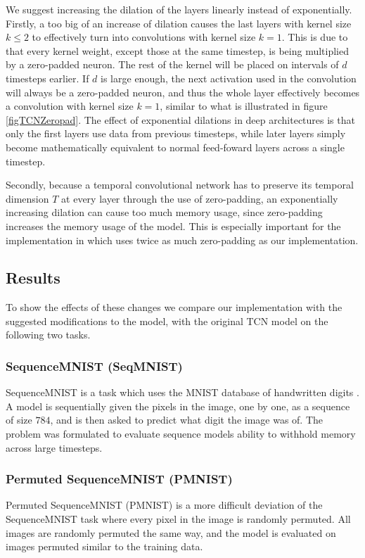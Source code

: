\documentclass[a4paper, twoside]{article}
\begin{document}
We suggest increasing the dilation of the layers linearly instead of exponentially. Firstly, a too big of an increase of dilation causes the last layers with kernel size $k \leq 2$ to effectively turn into convolutions with kernel size $k=1$. This is due to that every kernel weight, except those at the same timestep, is being multiplied by a zero-padded neuron. The rest of the kernel will be placed on intervals of $d$ timesteps earlier. If $d$ is large enough, the next activation used in the convolution will always be a zero-padded neuron, and thus the whole layer effectively becomes a convolution with kernel size $k=1$, similar to what is illustrated in figure \ref{figTCNZeropad}. The effect of exponential dilations in deep architectures is that only the first layers use data from previous timesteps, while later layers simply become mathematically equivalent to normal feed-foward layers across a single timestep.

Secondly, because a temporal convolutional network has to preserve its temporal dimension $T$ at every layer through the use of zero-padding, an exponentially increasing dilation can cause too much memory usage, since zero-padding increases the memory usage of the model. This is especially important for the implementation in \cite{tcn} which uses twice as much zero-padding as our implementation.

\subsection{Results}
To show the effects of these changes we compare our implementation with the suggested modifications to the model, with the original TCN model \cite{tcn} on the following two tasks.

\subsubsection{SequenceMNIST (SeqMNIST)}
SequenceMNIST is a task which uses the MNIST database of handwritten digits \cite{MNIST}. A model is sequentially given the pixels in the image, one by one, as a sequence of size $784$, and is then asked to predict what digit the image was of. The problem was formulated to evaluate sequence models ability to withhold memory across large timesteps.

\subsubsection{Permuted SequenceMNIST (PMNIST)}
Permuted SequenceMNIST (PMNIST) is a more difficult deviation of the SequenceMNIST task where every pixel in the image is randomly permuted. All images are randomly permuted the same way, and the model is evaluated on images permuted similar to the training data.
\end{document}
